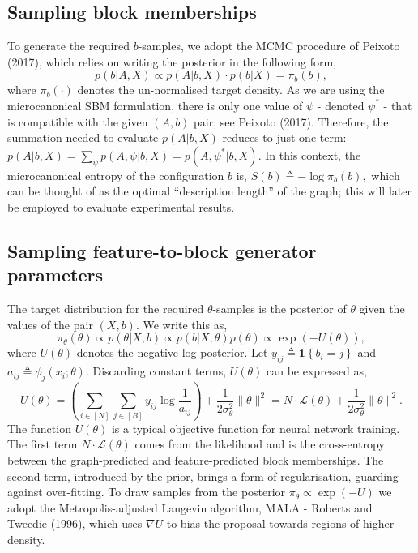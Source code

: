 \subsection{Sampling block memberships}

To generate the required $b$-samples, we adopt the MCMC
procedure of
Peixoto (2017),
which relies on writing the posterior in the following form,
%
\begin{equation}
	p(b | A, X) \propto p(A | b, X) \cdot p(b | X) = \pi_b(b),
\end{equation}
%
where $\pi_b(\cdot)$ denotes the un-normalised target density.
As we are using the microcanonical SBM formulation, there is only one 
value of $\psi$ - denoted $\psi^*$ - that is compatible with the given $(A, b)$ pair;
see Peixoto (2017).
Therefore, the summation needed to evaluate $p(A | b, X)$ reduces to just one term:
$p(A | b, X) = \sum_{\psi} \nolimits p(A , \psi | b, X) = p(A, \psi^* | b, X)$.
In
this context, the microcanonical entropy of the configuration $b$
is,
$S(b) \triangleq - \log \pi_b(b),$
which can be thought of as the optimal
``description length'' of the graph; 
this will later be employed 
to evaluate experimental results. 

\subsection{Sampling feature-to-block generator parameters}
\label{s:sfb}

The target distribution for the required $\theta$-samples 
is the posterior of $\theta$ given the values of the pair $(X, b)$. 
We write this as,
%
\begin{equation}
	\pi_\theta(\theta) \propto p(\theta | X, b) \propto p(b | X, \theta) p(\theta) \propto  \exp \left( - U(\theta) \right),
	\label{eq:U}
\end{equation}
%
where $U(\theta)$ denotes the negative log-posterior. Let $y_{ij} \triangleq \boldsymbol{1} \left\{ b_i = j \right\}$ and $a_{ij} \triangleq \phi_j(x_i; \theta)$. 
Discarding constant terms, $U(\theta)$ can be expressed as,
%
\begin{equation}
	U(\theta) = \left( \sum_{i \in [N]} \sum_{j \in [B]} y_{ij} \log \frac{1}{a_{ij}} \right)
	+ \frac{1}{2\sigma_\theta^2} \|\theta\|^2 = N \cdot \mathcal{L}(\theta) + \frac{1}{2\sigma_\theta^2} \|\theta\|^2.
	\label{eqn:U-form}
\end{equation}
%
The function $U(\theta)$ is a typical objective function for neural network training. 
The first term $N \cdot \mathcal{L}(\theta)$ comes from the likelihood and is the cross-entropy between the graph-predicted and feature-predicted block memberships. 
The second term, introduced by the prior, brings a form of regularisation, guarding against over-fitting. 
To draw samples from the posterior 
$\pi_\theta \propto \exp(-U)$ we adopt the Metropolis-adjusted Langevin
algorithm, MALA - Roberts and Tweedie (1996), which uses $\nabla U$ to bias the 
proposal towards regions of higher density.

